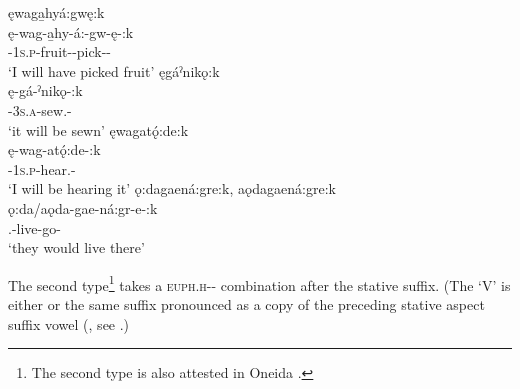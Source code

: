 \ea\label{ex:statvarex30} 
\ea ęwaga̱hyá:gwę:k\\
\gll ę-wag-a̱hy-á:-gw-ę-:k\\
 \fut-\textsc{1s.p}-fruit-{\joinerA}-pick-{\stative}-{\modalizer}\\
\glt `I will have picked fruit'
 \newpage
\ex ęgáˀnikǫ:k\\
\gll ę-gá-ˀnikǫ-:k\\
 \fut-\textsc{3s.a}-sew.{\stative}-{\modalizer}\\
\glt `it will be sewn'
\ex ęwagatǫ́:de:k\\
\gll ę-wag-atǫ́:de-:k\\
 \fut-\textsc{1s.p}-hear.{\stative}-{\modalizer}\\
\glt `I will be hearing it'
\ex ǫ:dagaená:gre:k, aǫdagaená:gre:k\\
\gll ǫ:da/aǫda-gae-ná:gr-e-:k\\
 {\indefinite.\cislocative}-live-go-{\modalizer}\\
\glt `they would live there'
\z
\z

The second type\footnote{The second type is also attested in Oneida \citep[88--89]{lounsbury_oneida_1953}.} takes a  \textsc{euph.h}-{\joiner}-\exsc{\modalizer} combination after the stative suffix. (The {\joiner} ‘V’ is either  {\joinerA} or the same suffix pronounced as a copy of the preceding stative aspect suffix vowel (, see .)

